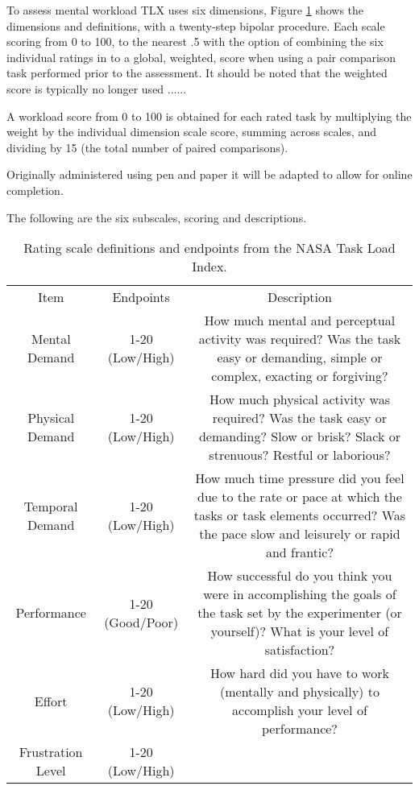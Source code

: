 \documentclass[man]{apa7}
\begin{document}
To assess mental workload TLX uses six dimensions, Figure \ref{tab:tlx} shows the dimensions and definitions, with a twenty-step bipolar procedure. Each scale scoring from 0 to 100, to the nearest .5 with the option of combining the six individual ratings in to a global, weighted, score when using a pair comparison task performed prior to the assessment. It should be noted that the weighted score is typically no longer used ......

A  workload  score  from  0  to  100  is  obtained  for  each  rated task  by  multiplying  the  weight  by  the  individual  dimension  scale  score, summing  across  scales,  and  dividing  by  15  (the  total  number  of  paired comparisons).

Originally administered using pen and paper it will be adapted to allow for online completion.

The following are the six subscales, scoring and descriptions.

\begin{table}
    \centering
    \begin{tabular}{ccc}
         Item               & Endpoints         & Description \\
         Mental Demand      &  1-20 (Low/High)  & How much mental and perceptual activity was required? Was the task easy or demanding, simple or complex, exacting or forgiving?\\
         Physical Demand    &  1-20 (Low/High)  & How much physical activity was required? Was the task easy or demanding? Slow or brisk? Slack or strenuous? Restful or laborious? \\
         Temporal Demand    &  1-20 (Low/High)  & How much time pressure did you feel due to the rate or pace at which the tasks or task elements occurred? Was the pace slow and leisurely or rapid and frantic? \\
         Performance        &  1-20 (Good/Poor) & How successful do you think you were in accomplishing the goals of the task set by the experimenter (or yourself)? What is your level of satisfaction? \\
         Effort             &  1-20 (Low/High)  & How hard did you have to work (mentally and physically) to accomplish your level of performance? \\
         Frustration Level  &  1-20 (Low/High)  & \\
    \end{tabular}
    \caption{Rating scale definitions and endpoints from the NASA Task Load Index.}
    \label{tab:tlx}
\end{table}
\end{document}
